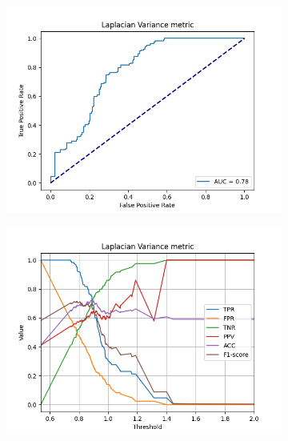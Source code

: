 \begin{figure}[H]
    \begin{subfigure}[t]{0.48\textwidth}
        \includegraphics[width=\textwidth]{Figures/lv/output_roc_lv_png.png}
        \caption{}
        \label{fig:LV_roc}
    \end{subfigure}\hspace{1em}
    \begin{subfigure}[t]{0.48\textwidth}
        \includegraphics[width=\textwidth]{Figures/lv/threshold_test_scores_lv_png.png}
        \caption{}
        \label{fig:LV_thresh}
    \end{subfigure}\hspace{1em}
    \caption{}
    \label{fig:LV_final}
\end{figure}



